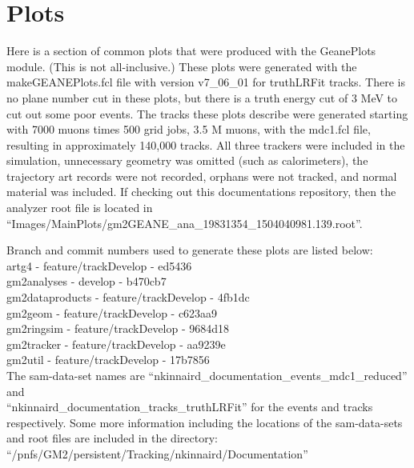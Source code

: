 \newpage
\section{Plots}
\label{sec:Plots}

Here is a section of common plots that were produced with the GeanePlots module. (This is not all-inclusive.) These plots were generated with the makeGEANEPlots.fcl file with version v7\_06\_01 for truthLRFit tracks. There is no plane number cut in these plots, but there is a truth energy cut of 3 MeV to cut out some poor events. The tracks these plots describe were generated starting with 7000 muons times 500 grid jobs, 3.5 M muons, with the mdc1.fcl file, resulting in approximately 140,000 tracks. All three trackers were included in the simulation, unnecessary geometry was omitted (such as calorimeters), the trajectory art records were not recorded, orphans were not tracked, and normal material was included. If checking out this documentations repository, then the analyzer root file is located in ``Images/MainPlots/gm2GEANE\_ana\_19831354\_1504040981.139.root''.

Branch and commit numbers used to generate these plots are listed below: \\

artg4 - feature/trackDevelop - ed5436 \\

gm2analyses - develop - b470cb7 \\

gm2dataproducts - feature/trackDevelop - 4fb1dc \\

gm2geom - feature/trackDevelop - c623aa9 \\

gm2ringsim - feature/trackDevelop - 9684d18 \\

gm2tracker - feature/trackDevelop - aa9239e \\

gm2util - feature/trackDevelop - 17b7856 \\

The sam-data-set names are ``nkinnaird\_documentation\_events\_mdc1\_reduced'' and \\
``nkinnaird\_documentation\_tracks\_truthLRFit'' for the events and tracks respectively.
Some more information including the locations of the sam-data-sets and root files are included in the directory: \\
``/pnfs/GM2/persistent/Tracking/nkinnaird/Documentation''


